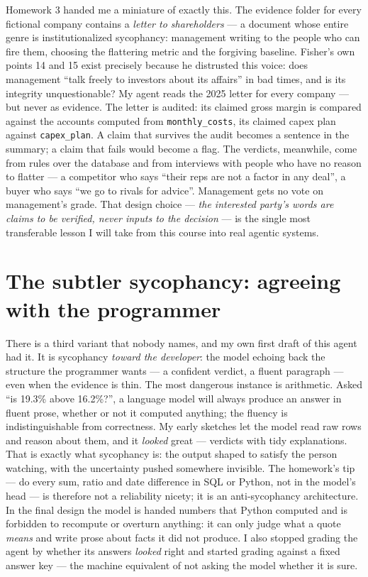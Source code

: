 \documentclass[11pt,a4paper]{article}
\begin{document}
Homework 3 handed me a miniature of exactly this. The evidence folder for every
fictional company contains a \emph{letter to shareholders} --- a document whose
entire genre is institutionalized sycophancy: management writing to the people
who can fire them, choosing the flattering metric and the forgiving baseline.
Fisher's own points 14 and 15 exist precisely because he distrusted this voice:
does management ``talk freely to investors about its affairs'' in bad times, and
is its integrity unquestionable? My agent reads the 2025 letter for every
company --- but never as evidence. The letter is audited: its claimed gross
margin is compared against the accounts computed from \texttt{monthly\_costs},
its claimed capex plan against \texttt{capex\_plan}. A claim that survives the
audit becomes a sentence in the summary; a claim that fails would become a
flag. The verdicts, meanwhile, come from rules over the database and from
interviews with people who have no reason to flatter --- a competitor who says
``their reps are not a factor in any deal'', a buyer who says ``we go to rivals
for advice''. Management gets no vote on management's grade. That design choice
--- \emph{the interested party's words are claims to be verified, never
inputs to the decision} --- is the single most transferable lesson I will take
from this course into real agentic systems.

\section{The subtler sycophancy: agreeing with the programmer}

There is a third variant that nobody names, and my own first draft of this
agent had it. It is sycophancy \emph{toward the developer}: the model echoing
back the structure the programmer wants --- a confident verdict, a fluent
paragraph --- even when the evidence is thin. The most dangerous instance is
arithmetic. Asked ``is 19.3\% above 16.2\%?'', a language model will always
produce an answer in fluent prose, whether or not it computed anything; the
fluency is indistinguishable from correctness. My early sketches let the model
read raw rows and reason about them, and it \emph{looked} great --- verdicts
with tidy explanations. That is exactly what sycophancy is: the output shaped
to satisfy the person watching, with the uncertainty pushed somewhere
invisible. The homework's tip --- do every sum, ratio and date difference in
SQL or Python, not in the model's head --- is therefore not a reliability
nicety; it is an anti-sycophancy architecture. In the final design the model
is handed numbers that Python computed and is forbidden to recompute or
overturn anything: it can only judge what a quote \emph{means} and write prose
about facts it did not produce. I also stopped grading the agent by whether its
answers \emph{looked} right and started grading against a fixed answer key ---
the machine equivalent of not asking the model whether it is sure.
\end{document}
